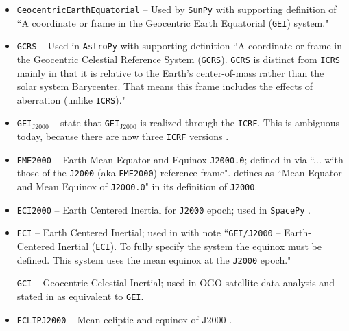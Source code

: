 \documentclass[draft]{agujournal2019}
\begin{document}
\begin{itemize}
    \item \texttt{GeocentricEarthEquatorial} -- Used by \texttt{SunPy} \cite{SunPy} with supporting definition of ``A coordinate or frame in the Geocentric Earth Equatorial (\texttt{GEI}) system."
    
    \item \texttt{GCRS} --  Used in \texttt{AstroPy} \cite{AstroPy2022} with supporting definition ``A coordinate or frame in the Geocentric Celestial Reference System (\texttt{GCRS}). \texttt{GCRS} is distinct from \texttt{ICRS} mainly in that it is relative to the Earth’s center-of-mass rather than the solar system Barycenter. That means this frame includes the effects of aberration (unlike \texttt{ICRS})."

    \item \texttt{GEI}$_\mathrm{J2000}$ --  state that \texttt{GEI}$_\mathrm{J2000}$ is realized through the \texttt{ICRF}. This is ambiguous today, because there are now three \texttt{ICRF} versions \cite{Charlot2020}.

    \item \texttt{EME2000} -- Earth Mean Equator and Equinox \texttt{J2000.0}; defined in  via ``... with those of the \texttt{J2000} (aka \texttt{EME2000}) reference frame".  defines as ``Mean Equator and Mean Equinox of \texttt{J2000.0}" in its definition of \texttt{J2000}.

    \item \texttt{ECI2000} -- Earth Centered Inertial for \texttt{J2000} epoch; used in \texttt{SpacePy} \cite{Niehof2022}.

    \item \texttt{ECI} -- Earth Centered Inertial; used in  with note ``\texttt{GEI/J2000} – Earth-Centered Inertial (\texttt{ECI}). To fully specify the system the equinox must be defined. This system uses the mean equinox at the \texttt{J2000} epoch."
    
    
    \texttt{GCI} -- Geocentric Celestial Inertial; used in OGO satellite data analysis \cite{NASA1970} and stated in  as equivalent to \texttt{GEI}.

    \item \texttt{ECLIPJ2000} -- Mean ecliptic and equinox of J2000 \cite{NAIFFrames2025}.


\end{itemize}
\end{document}
